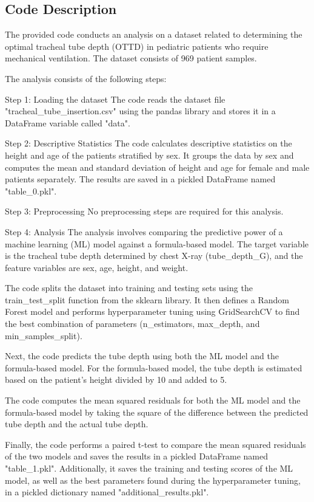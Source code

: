 \documentclass[11pt]{article}
\begin{document}
\subsection{Code Description}

The provided code conducts an analysis on a dataset related to determining the optimal tracheal tube depth (OTTD) in pediatric patients who require mechanical ventilation. The dataset consists of 969 patient samples.

The analysis consists of the following steps:

Step 1: Loading the dataset
The code reads the dataset file "tracheal\_tube\_insertion.csv" using the pandas library and stores it in a DataFrame variable called "data".

Step 2: Descriptive Statistics
The code calculates descriptive statistics on the height and age of the patients stratified by sex. It groups the data by sex and computes the mean and standard deviation of height and age for female and male patients separately. The results are saved in a pickled DataFrame named "table\_0.pkl".

Step 3: Preprocessing
No preprocessing steps are required for this analysis.

Step 4: Analysis
The analysis involves comparing the predictive power of a machine learning (ML) model against a formula-based model. The target variable is the tracheal tube depth determined by chest X-ray (tube\_depth\_G), and the feature variables are sex, age, height, and weight. 

The code splits the dataset into training and testing sets using the train\_test\_split function from the sklearn library. It then defines a Random Forest model and performs hyperparameter tuning using GridSearchCV to find the best combination of parameters (n\_estimators, max\_depth, and min\_samples\_split).

Next, the code predicts the tube depth using both the ML model and the formula-based model. For the formula-based model, the tube depth is estimated based on the patient's height divided by 10 and added to 5. 

The code computes the mean squared residuals for both the ML model and the formula-based model by taking the square of the difference between the predicted tube depth and the actual tube depth. 

Finally, the code performs a paired t-test to compare the mean squared residuals of the two models and saves the results in a pickled DataFrame named "table\_1.pkl". Additionally, it saves the training and testing scores of the ML model, as well as the best parameters found during the hyperparameter tuning, in a pickled dictionary named "additional\_results.pkl".
\end{document}
